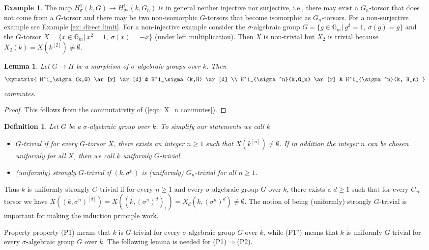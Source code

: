\documentclass[oneside,reqno]{amsart}
\newtheorem{lemma}[theo]{Lemma}
\newtheorem{defi}[theo]{Definition}
\theoremstyle{definition}
\newtheorem{ex}[theo]{Example}
\newcommand{\s}{\sigma}
\newcommand{\Gm}{\mathbb{G}_m}
\newcommand{\kn}{k^{[n]}}
\newcommand{\po}{{\rm{(P1$^u$)}}}
\newcommand{\poweak}{{\rm{(P1)}}}
\newcommand{\pwweak}{{\rm{(P2)}}}
\begin{document}
\begin{ex}
	The map $H^1_\s(k,G)\to H^1_{\s^n}(k,G_n)$ is in general neither injective nor surjective, i.e., there may exist a $G_n$-torsor that does not come from a $G$-torsor and there may be two non-isomorphic $G$-torsors that become isomorphic as $G_n$-torsors. For a non-surjective example see Example \ref{ex: direct limit}. For a non-injective example consider the $\s$-algebraic group $G=\{g\in\Gm|\ g^2=1,\ \s(g)=g\}$ and the $G$-torsor $X=\{x\in \Gm|\ x^2=1,\ \s(x)=-x\}$ (under left multiplication). Then $X$ is non-trivial but $X_2$ is trivial because $X_2(k)=X(k^{[2]})\neq\emptyset$.
\end{ex}	


\begin{lemma} \label{lemma: commutativity of X_n and H}
	Let $G\to H$ be a morphism of $\s$-algebraic groups over $k$. Then
	$$ 
	\xymatrix{
	 H^1_\s(k,G) \ar[r] \ar[d] & H^1_\s(k,H) \ar[d] \\
	 H^1_{\s^n}(k,G_n) \ar[r] & H^1_{\s^n}(k, H_n)
	}
		$$
		commutes.
\end{lemma}
\begin{proof}
	This follows from the commutativity of (\ref{eqn: X_n commutes}).
\end{proof}


\begin{defi} \label{defi: Gtrivial}
	Let $G$ be a $\s$-algebraic group over $k$. To simplify our statements we call $k$ 
	\begin{itemize}
		\item \emph{$G$-trivial} if for every $G$-torsor $X$, there exists an integer $n\geq 1$ such that $X(\kn)\neq\emptyset$. If in addition the integer $n$ can be chosen uniformly for all $X$, then we call $k$ \emph{uniformly $G$-trivial}.
		\item (uniformly) \emph{strongly $G$-trivial} if $(k,\s^n)$ is (uniformly) $G_n$-trivial for all $n\geq 1$.
	\end{itemize}
\end{defi}

Thus $k$ is uniformly strongly $G$-trivial if for every $n\geq 1$ and every $\s$-algebraic group $G$ over $k$, there exists a $d\geq 1$ such that for every $G_n$-torsor we have $X((k,\s^n)^{[d]})=X((k,(\s^n)^d)_1)=X_d(k,(\s^n)^d)\neq\emptyset$. The notion of being (uniformly) strongly $G$-trivial is important for making the induction principle work.

 Property property \poweak{} means that $k$ is $G$-trivial for every $\s$-algebraic group $G$ over $k$, while \po{} means that $k$ is uniformly $G$-trivial for every $\s$-algebraic group $G$ over $k$. 
The following lemma is needed for \poweak{}$\Rightarrow$\pwweak.
 
\end{document}
